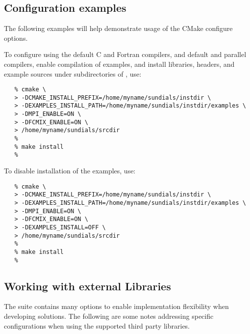 
\subsection{Configuration examples}

The following examples will help demonstrate usage of the CMake configure options.

\noindent To configure {\sundials} using the default C and Fortran compilers,
and default  and  parallel compilers, 
enable compilation of examples, and install libraries, headers, and
example sources under subdirectories of
, use:

\begin{verbatim}
   % cmake \
   > -DCMAKE_INSTALL_PREFIX=/home/myname/sundials/instdir \
   > -DEXAMPLES_INSTALL_PATH=/home/myname/sundials/instdir/examples \
   > -DMPI_ENABLE=ON \
   > -DFCMIX_ENABLE=ON \
   > /home/myname/sundials/srcdir
   %
   % make install
   % 
\end{verbatim}

\noindent To disable installation of the examples, use:
\begin{verbatim}
   % cmake \
   > -DCMAKE_INSTALL_PREFIX=/home/myname/sundials/instdir \
   > -DEXAMPLES_INSTALL_PATH=/home/myname/sundials/instdir/examples \
   > -DMPI_ENABLE=ON \
   > -DFCMIX_ENABLE=ON \
   > -DEXAMPLES_INSTALL=OFF \
   > /home/myname/sundials/srcdir
   %
   % make install
   % 
\end{verbatim}

\subsection{Working with external Libraries} \label{ss:externallibs}

The {\sundials} suite contains many options to enable implementation flexibility
when developing solutions. The following are some notes addressing specific configurations
when using the supported third party libraries.

